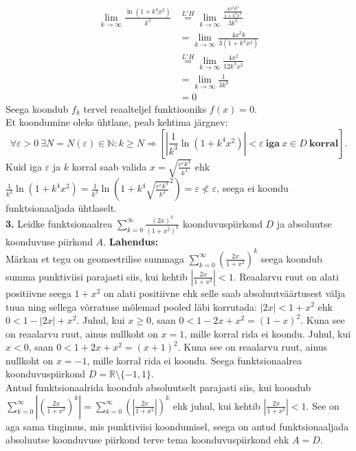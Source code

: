 \documentclass{article}
\begin{document}
\begin{equation*}
\begin{aligned}
\lim_{k\to\infty}\frac{\ln(1+k^4x^2)}{k^3}&\stackrel{L'H}{=}\lim_{k\to\infty}\frac{\frac{4x^2k^3}{1+k^4x^2}}{3k^2}\\
&=\lim_{k\to\infty}\frac{4x^2k}{3(1+k^4x^2)}\\
&\stackrel{L'H}{=}\lim_{k\to\infty}\frac{4x^2}{12k^3x^2}\\
&=\lim_{k\to\infty}\frac{1}{3k^3}\\
&=0
\end{aligned}
\end{equation*}
Seega koondub $f_k$ tervel reaalteljel funktiooniks $f(x)=0$.\\
Et koondumine oleks \"uhtlane, peab kehtima j\"argnev:
\begin{equation*}
\forall \varepsilon>0\ \exists N=N(\varepsilon)\in\mathbb{N}:k\geq N\Rightarrow [|\frac{1}{k^3}\ln(1+k^4x^2)|<\varepsilon\ \mathbf{iga}\ x\in D\ \mathbf{korral}].
\end{equation*}
Kuid iga $\varepsilon$ ja $k$ korral saab valida $x=\sqrt{\frac{e^\varepsilon k^3}{k^4}}$ ehk $\frac{1}{k^3}\ln(1+k^4x^2)=\frac{1}{k^3}\ln(1+k^4\sqrt{\frac{e^\varepsilon k^3}{k^4}}^2)=\varepsilon\nless\varepsilon$, seega ei koondu funktsionaaljada \"uhtlaselt.
\pagebreak\\
\textbf{3.} Leidke funktsionaalrea $\sum_{k=0}^\infty\frac{(2x)^k}{(1+x^2)^k}$ koonduvuspiirkond $D$ ja absoluutse koonduvuse piirkond $A$.
\textbf{Lahendus:}\\
M\"arkan et tegu on geomeetrilise summaga $\sum_{k=0}^\infty\left(\frac{2x}{1+x^2}\right)^k$ seega koondub summa punktiviisi parajasti siis, kui kehtib $\left|\frac{2x}{1+x^2}\right|<1$. Reaalarvu ruut on alati positiivne seega $1+x^2$ on alati positiivne ehk selle saab absoluutv\"a\"artusest v\"alja tuua ning sellega v\~orratuse m\~olemad pooled l\"abi korrutada: $|2x|<1+x^2$ ehk $0<1-|2x|+x^2$. Juhul, kui $x\geq0$, saan $0<1-2x+x^2=(1-x)^2$. Kuna see on reaalarvu ruut, ainus nullkoht on $x=1$, mille korral rida ei koondu. Juhul, kui $x<0$, saan $0<1+2x+x^2=(x+1)^2$. Kuna see on reaalarvu ruut, ainus nullkoht on $x=-1$, mille korral rida ei koondu. Seega funktsionaalrea koonduvuspiirkond $D=\mathbb{R}\setminus\{-1,1\}$.\\
Antud funktsionaalrida koondub absoluutselt parajasti siis, kui koondub $\sum_{k=0}^\infty\left|\left(\frac{2x}{1+x^2}\right)^k\right|=\sum_{k=0}^\infty\left(\left|\frac{2x}{1+x^2}\right|\right)^k$ ehk juhul, kui kehtib $\left|\frac{2x}{1+x^2}\right|<1$. See on aga sama tingimus, mis punktiviisi koondumisel, seega on antud funktsionaaljada absoluutse koonduvuse piirkond terve tema koonduvuspiirkond ehk $A=D$.
\end{document}
